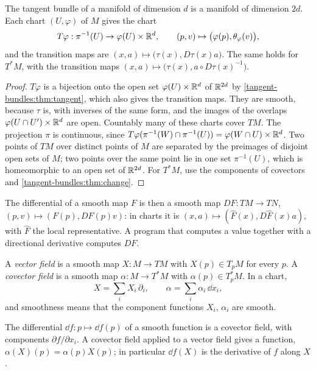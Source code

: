 \begin{notechapter}
\begin{theorem}\label{tangent-bundles:thm:bundle}
The tangent bundle of a manifold of dimension $d$ is a manifold of
dimension $2d$. Each chart $(U, \varphi)$ of $M$ gives the chart
\[
  T\varphi:\pi^{-1}(U)\to\varphi(U)\times\mathbb{R}^d , \qquad
  (p, v)\mapsto\bigl(\varphi(p), \theta_\varphi(v)\bigr) ,
\]
and the transition maps are
$(x, a)\mapsto\bigl(\tau(x), D\tau(x)a\bigr)$. The same holds for $T^*M$,
with the transition maps
$(x, a)\mapsto\bigl(\tau(x), a\circ D\tau(x)^{-1}\bigr)$.
\end{theorem}

\begin{proof}
$T\varphi$ is a bijection onto the open set $\varphi(U)\times\mathbb{R}^d$ of
$\mathbb{R}^{2d}$ by \cref{tangent-bundles:thm:tangent}, which also gives the
transition maps. They are smooth, because $\tau$ is, with inverses of the
same form, and the images of the overlaps
$\varphi(U\cap U')\times\mathbb{R}^d$ are open. Countably many of these charts
cover $TM$. The projection $\pi$ is continuous, since
$T\varphi(\pi^{-1}(W)\cap\pi^{-1}(U)) = \varphi(W\cap U)\times\mathbb{R}^d$. Two
points of $TM$ over distinct points of $M$ are separated by the preimages
of disjoint open sets of $M$; two points over the same point lie in one
set $\pi^{-1}(U)$, which is homeomorphic to an open set of $\mathbb{R}^{2d}$. For
$T^*M$, use the components of covectors and
\cref{tangent-bundles:thm:change}.
\end{proof}

The differential of a smooth map $F$ is then a smooth map
$DF:TM\to TN$, $(p, v)\mapsto(F(p), DF(p)v)$: in charts it is
$(x, a)\mapsto(\hat F(x), D\hat F(x)a)$, with $\hat F$ the local
representative. A program that computes a value together with a
directional derivative computes $DF$.

\begin{definition}
\label{tangent-bundles:def:fields}
A \emph{vector field} is a smooth map $X:M\to TM$ with $X(p)\in T_pM$
for every $p$. A \emph{covector field} is a smooth map
$\alpha:M\to T^*M$ with $\alpha(p)\in T_p^*M$. In a chart,
\[
  X = \sum_iX_i\,\partial_i , \qquad \alpha = \sum_i\alpha_i\,\dd x_i ,
\]
and smoothness means that the component functions $X_i$, $\alpha_i$ are
smooth.
\end{definition}

The differential $\dd f:p\mapsto\dd f(p)$ of a smooth function is a
covector field, with components $\partial f/\partial x_i$. A covector
field applied to a vector field gives a function,
$\alpha(X)(p) = \alpha(p)X(p)$; in particular $\dd f(X)$ is the
derivative of $f$ along $X$.


\end{notechapter}
